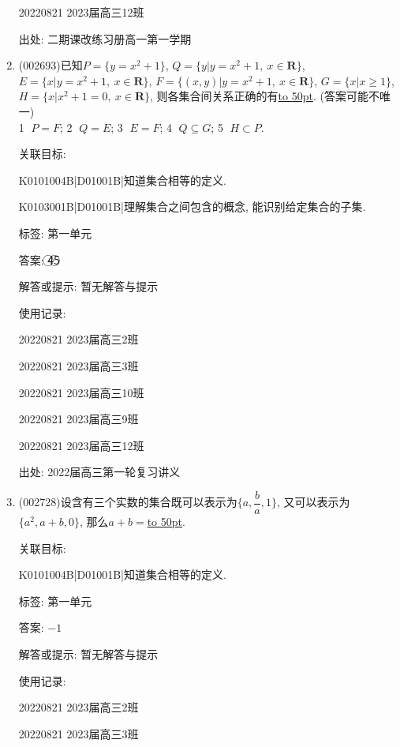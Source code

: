 \documentclass[10pt,a4paper]{article}
\newcommand{\blank}[1]{\underline{\hbox to #1pt{}}}
\begin{document}
\begin{enumerate}[1.]
20220821	2023届高三12班	


出处: 二期课改练习册高一第一学期
\newpage
\item{ (002693)}已知$P=\{y=x^2+1\}$, $Q=\{y|y=x^2+1, \ x\in \mathbf{R}\}$, $E=\{x|y=x^2+1, \  x\in \mathbf{R}\}$, $F=\{(x,y)|y=x^2+1, \ x\in \mathbf{R}\}$, $G=\{x|x\ge 1\}$, $H=\{x|x^2+1=0, \ x\in \mathbf{R}\}$, 则各集合间关系正确的有\blank{50}. (答案可能不唯一)\\
\textcircled{1} $P=F$; \textcircled{2} $Q=E$; \textcircled{3} $E=F$; \textcircled{4} $Q\subseteq G$; \textcircled{5} $H\subset P$.


关联目标:

K0101004B|D01001B|知道集合相等的定义.

K0103001B|D01001B|理解集合之间包含的概念, 能识别给定集合的子集.



标签: 第一单元

答案: \textcircled{4}\textcircled{5}

解答或提示: 暂无解答与提示

使用记录:

20220821	2023届高三2班	

20220821	2023届高三3班	

20220821	2023届高三10班	

20220821	2023届高三9班	

20220821	2023届高三12班	


出处: 2022届高三第一轮复习讲义
\newpage
\item{ (002728)}设含有三个实数的集合既可以表示为$\{a,\dfrac ba,1\}$, 又可以表示为$\{a^2,a+b,0\}$, 那么$a+b=$\blank{50}.


关联目标:

K0101004B|D01001B|知道集合相等的定义.



标签: 第一单元

答案: $-1$

解答或提示: 暂无解答与提示

使用记录:

20220821	2023届高三2班	

20220821	2023届高三3班	


\end{enumerate}
\end{document}
